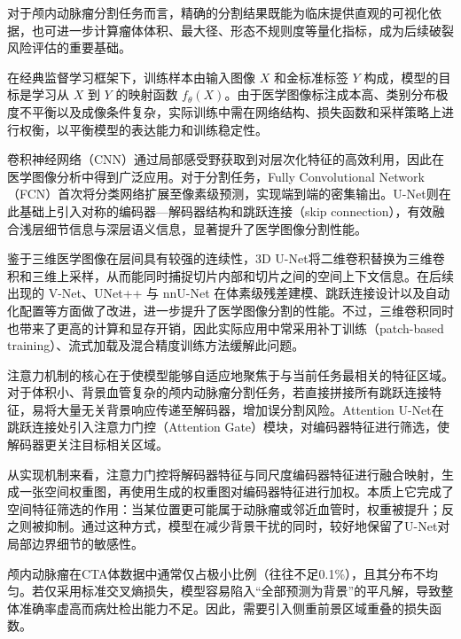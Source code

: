 对于颅内动脉瘤分割任务而言，精确的分割结果既能为临床提供直观的可视化依据，也可进一步计算瘤体体积、最大径、形态不规则度等量化指标，成为后续破裂风险评估的重要基础。

在经典监督学习框架下，训练样本由输入图像 $X$ 和金标准标签 $Y$ 构成，模型的目标是学习从 $X$ 到 $Y$ 的映射函数 $f_{\theta}(X)$。由于医学图像标注成本高、类别分布极度不平衡以及成像条件复杂，实际训练中需在网络结构、损失函数和采样策略上进行权衡，以平衡模型的表达能力和训练稳定性。


卷积神经网络（CNN）通过局部感受野获取到对层次化特征的高效利用，因此在医学图像分析中得到广泛应用。对于分割任务，Fully Convolutional Network（FCN）首次将分类网络扩展至像素级预测，实现端到端的密集输出\cite{long2015}。U-Net则在此基础上引入对称的编码器—解码器结构和跳跃连接（skip connection），有效融合浅层细节信息与深层语义信息，显著提升了医学图像分割性能\cite{unet}。

鉴于三维医学图像在层间具有较强的连续性，3D U-Net将二维卷积替换为三维卷积和三维上采样，从而能同时捕捉切片内部和切片之间的空间上下文信息\cite{unet3d,cciccek20163d}。在后续出现的 V-Net、UNet++ 与 nnU-Net 在体素级残差建模、跳跃连接设计以及自动化配置等方面做了改进，进一步提升了医学图像分割的性能\cite{milletari2016,zhou2018unetpp,nnunet}。不过，三维卷积同时也带来了更高的计算和显存开销，因此实际应用中常采用补丁训练（patch-based training）、流式加载及混合精度训练方法缓解此问题。


注意力机制的核心在于使模型能够自适应地聚焦于与当前任务最相关的特征区域。对于体积小、背景血管复杂的颅内动脉瘤分割任务，若直接拼接所有跳跃连接特征，易将大量无关背景响应传递至解码器，增加误分割风险。Attention U-Net在跳跃连接处引入注意力门控（Attention Gate）模块，对编码器特征进行筛选，使解码器更关注目标相关区域\cite{attention_unet}。

从实现机制来看，注意力门控将解码器特征与同尺度编码器特征进行融合映射，生成一张空间权重图，再使用生成的权重图对编码器特征进行加权。本质上它完成了空间特征筛选的作用：当某位置更可能属于动脉瘤或邻近血管时，权重被提升；反之则被抑制。通过这种方式，模型在减少背景干扰的同时，较好地保留了U-Net对局部边界细节的敏感性。


颅内动脉瘤在CTA体数据中通常仅占极小比例（往往不足0.1\%），且其分布不均匀。若仅采用标准交叉熵损失，模型容易陷入“全部预测为背景”的平凡解，导致整体准确率虚高而病灶检出能力不足。因此，需要引入侧重前景区域重叠的损失函数。

